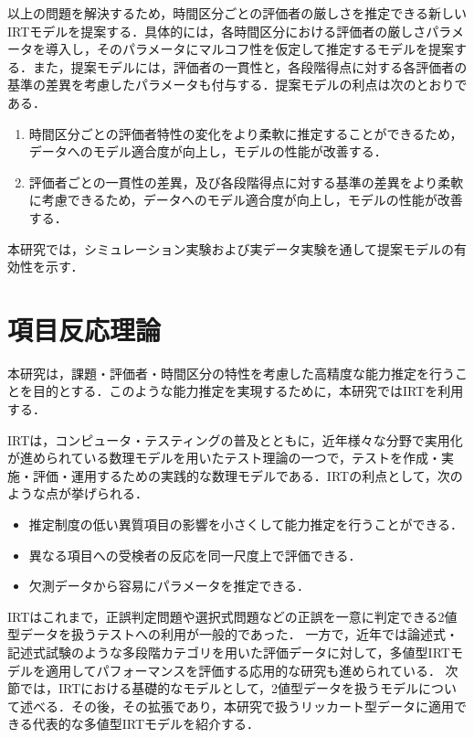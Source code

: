 \documentclass[a4paper,11pt,oneside,openany]{jsbook}
\begin{document}
以上の問題を解決するため，時間区分ごとの評価者の厳しさを推定できる新しいIRTモデルを提案する．具体的には，各時間区分における評価者の厳しさパラメータを導入し，そのパラメータにマルコフ性を仮定して推定するモデルを提案する．また，提案モデルには，評価者の一貫性と，各段階得点に対する各評価者の基準の差異を考慮したパラメータも付与する．提案モデルの利点は次のとおりである．
\begin{enumerate}
  \item 時間区分ごとの評価者特性の変化をより柔軟に推定することができるため，データへのモデル適合度が向上し，モデルの性能が改善する．
  \item 評価者ごとの一貫性の差異，及び各段階得点に対する基準の差異をより柔軟に考慮できるため，データへのモデル適合度が向上し，モデルの性能が改善する．
\end{enumerate}
本研究では，シミュレーション実験および実データ実験を通して提案モデルの有効性を示す．
\newpage

\chapter{項目反応理論}
本研究は，課題・評価者・時間区分の特性を考慮した高精度な能力推定を行うことを目的とする．このような能力推定を実現するために，本研究ではIRTを利用する．

IRTは，コンピュータ・テスティングの普及とともに，近年様々な分野で実用化が進められている数理モデルを用いたテスト理論の一つで，テストを作成・実施・評価・運用するための実践的な数理モデルである\cite{IRTtext,IRTLord}．IRTの利点として，次のような点が挙げられる\cite{IRTUtoUeno}．
\begin{itemize}
\item 推定制度の低い異質項目の影響を小さくして能力推定を行うことができる．
\item 異なる項目への受検者の反応を同一尺度上で評価できる．
\item 欠測データから容易にパラメータを推定できる．
\end{itemize}

IRTはこれまで，正誤判定問題や選択式問題などの正誤を一意に判定できる2値型データを扱うテストへの利用が一般的であった． 一方で，近年では論述式・記述式試験のような多段階カテゴリを用いた評価データに対して，多値型IRTモデルを適用してパフォーマンスを評価する応用的な研究も進められている\cite{IRTMatteucci,IRTDeCarlo}．
次節では，IRTにおける基礎的なモデルとして，2値型データを扱うモデルについて述べる．その後，その拡張であり，本研究で扱うリッカート型データに適用できる代表的な多値型IRTモデルを紹介する．
\end{document}
